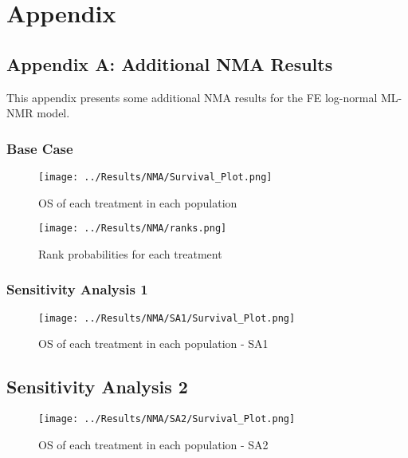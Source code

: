 \chapter{Appendix}\label{appChap}

\section{Appendix A: Additional NMA Results}\label{NMAAppendix}

This appendix presents some additional NMA results for the FE log-normal ML-NMR model. 

\subsection{Base Case}

\begin{figure}[h]
    \centering
    \texttt{[image: ../Results/NMA/Survival\_Plot.png]}
    \caption{OS of each treatment in each population}
    \label{fig:pred_survbc}
\end{figure}

\begin{figure}[h]
    \centering
    \texttt{[image: ../Results/NMA/ranks.png]}
    \caption{Rank probabilities for each treatment}
    \label{fig:rankplot}
\end{figure}

\clearpage
\subsection{Sensitivity Analysis 1}

\begin{figure}[h]
    \centering
    \texttt{[image: ../Results/NMA/SA1/Survival\_Plot.png]}
    \caption{OS of each treatment in each population - SA1}
    \label{fig:pred_survSA1}
\end{figure}

\clearpage
\section{Sensitivity Analysis 2}

\begin{figure}[h]
    \centering
    \texttt{[image: ../Results/NMA/SA2/Survival\_Plot.png]}
    \caption{OS of each treatment in each population - SA2}
    \label{fig:pred_survSA2}
\end{figure}

